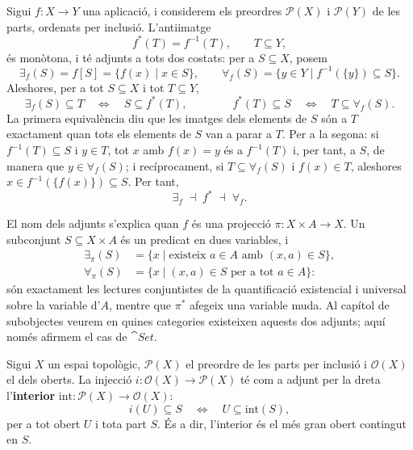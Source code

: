 \begin{exemple}\label{ex:quantificadors-set}
Sigui $f\colon X\to Y$ una aplicació, i considerem els preordres $\mathcal P(X)$ i $\mathcal P(Y)$ de les parts, ordenats per inclusió. L'antiimatge
\[
f^{*}(T)=f^{-1}(T),\qquad T\subseteq Y,
\]
és monòtona, i té adjunts a tots dos costats: per a $S\subseteq X$, posem
\[
\exists_f(S)=f[S]=\{f(x)\mid x\in S\},
\qquad
\forall_f(S)=\{y\in Y\mid f^{-1}(\{y\})\subseteq S\}.
\]
Aleshores, per a tot $S\subseteq X$ i tot $T\subseteq Y$,
\[
\exists_f(S)\subseteq T
\quad\Longleftrightarrow\quad
S\subseteq f^{*}(T),
\qquad\qquad
f^{*}(T)\subseteq S
\quad\Longleftrightarrow\quad
T\subseteq\forall_f(S).
\]
La primera equivalència diu que les imatges dels elements de $S$ són a $T$ exactament quan tots els elements de $S$ van a parar a $T$. Per a la segona: si $f^{-1}(T)\subseteq S$ i $y\in T$, tot $x$ amb $f(x)=y$ és a $f^{-1}(T)$ i, per tant, a $S$, de manera que $y\in\forall_f(S)$; i recíprocament, si $T\subseteq\forall_f(S)$ i $f(x)\in T$, aleshores $x\in f^{-1}(\{f(x)\})\subseteq S$. Per tant,
\[
\exists_f\;\dashv\;f^{*}\;\dashv\;\forall_f.
\]

El nom dels adjunts s'explica quan $f$ és una projecció $\pi\colon X\times A\to X$. Un subconjunt $S\subseteq X\times A$ és un predicat en dues variables, i
\[
\begin{aligned}
\exists_\pi(S)&=\{x\mid \text{existeix }a\in A\text{ amb }(x,a)\in S\},\\
\forall_\pi(S)&=\{x\mid (x,a)\in S\text{ per a tot }a\in A\}:
\end{aligned}
\]
són exactament les lectures conjuntistes de la quantificació existencial i universal sobre la variable d'$A$, mentre que $\pi^{*}$ afegeix una variable muda. Al capítol de subobjectes veurem en quines categories existeixen aquests dos adjunts; aquí només afirmem el cas de $\cat{Set}$.
\end{exemple}

\begin{exemple}
Sigui $X$ un espai topològic, $\mathcal P(X)$ el preordre de les parts per inclusió i $\mathcal O(X)$ el dels oberts. La injecció $i\colon\mathcal O(X)\to\mathcal P(X)$ té com a adjunt per la dreta l'\textbf{interior} $\mathrm{int}\colon\mathcal P(X)\to\mathcal O(X)$:
\[
i(U)\subseteq S
\quad\Longleftrightarrow\quad
U\subseteq\mathrm{int}(S),
\]
per a tot obert $U$ i tota part $S$. És a dir, l'interior és el més gran obert contingut en $S$.
\end{exemple}


